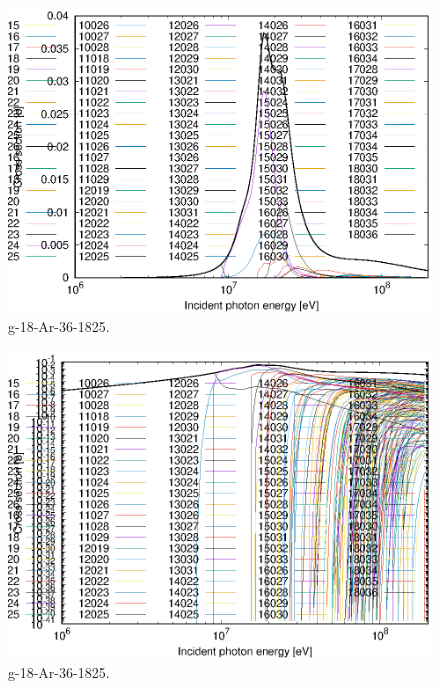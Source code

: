 \begin{figure}
 \includegraphics[width=\linewidth]{eps/g_18-Ar-36_1825.eps}
  \caption{g-18-Ar-36-1825.}
\end{figure}
\begin{figure}
 \includegraphics[width=\linewidth]{eps-log/g_18-Ar-36_1825.eps}
 \caption{g-18-Ar-36-1825.}
\end{figure}
\newpage \clearpage

